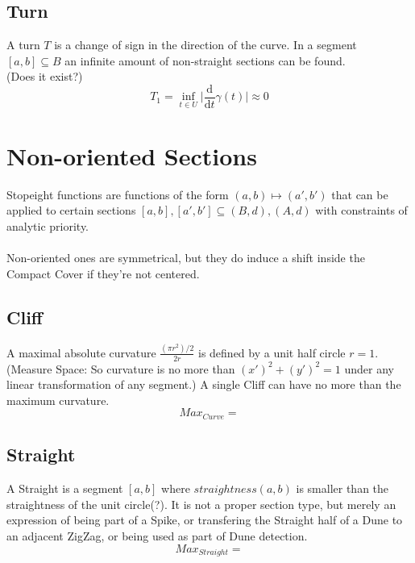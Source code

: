 \documentclass{report}
\begin{document}
\subsection{Turn}
A turn $T$ is a change of sign in the direction of the curve. In a segment $[a,b] \subseteq B$ an infinite amount of non-straight sections can be found.\\
(Does it exist?)
\begin{equation}
T_{1} = \inf_{t \in U} \lvert \frac{\mathrm{d}}{\mathrm{d}t}\gamma(t) \rvert \approx 0
\end{equation}

\section{Non-oriented Sections}
Stopeight functions are functions of the form $(a,b) \mapsto (a',b')$ that can be applied to certain sections $[a,b],[a',b'] \subseteq (B,d),(A,d)$ with constraints of analytic priority.\\\\
Non-oriented ones are symmetrical, but they do induce a shift inside the Compact Cover if they're not centered.

\subsection{Cliff}
A maximal absolute curvature $\frac{(\pi r^2) /2}{2r}$ is defined by a unit half circle $r=1$. (Measure Space: So curvature is no more than $(x')^2 + (y')^2 =1$  under any linear transformation of any segment.)
A single Cliff can have no more than the maximum curvature.
\begin{equation}
Max_{Curve}=
\end{equation}

\subsection{Straight}
A Straight is a segment $[a,b]$ where $straightness(a,b)$ is smaller than the straightness of the unit circle(?). It is not a proper section type, but merely an expression of being part of a Spike, or transfering the Straight half of a Dune to an adjacent ZigZag, or being used as part of Dune detection.
\begin{equation}
Max_{Straight}=
\end{equation}
\end{document}
